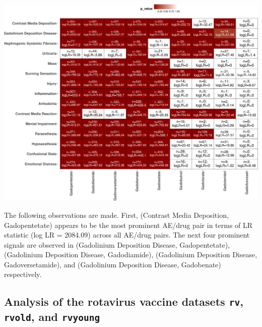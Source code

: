 \begin{center}\includegraphics[width=1\linewidth]{RJ-2023-027_files/figure-latex/heatmap-zip-gbca-latex-1} \end{center}

The following observations are made. First, (Contrast Media Deposition, Gadopentetate) appears to be the most prominent AE/drug pair in terms of LR statistic (log LR = 2084.09) across all AE/drug pairs. The next four prominent signals are observed in (Gadolinium Deposition Disease, Gadopentetate), (Gadolinium Deposition Disease, Gadodiamide), (Gadolinium Deposition Disease, Gadoversetamide), and (Gadolinium Deposition Disease, Gadobenate) respectively.

\hypertarget{analysis-of-the-rotavirus-vaccine-datasets-rv-rvold-and-rvyoung}{%
\subsection{\texorpdfstring{Analysis of the rotavirus vaccine datasets \texttt{rv}, \texttt{rvold}, and \texttt{rvyoung}}{Analysis of the rotavirus vaccine datasets rv, rvold, and rvyoung}}\label{analysis-of-the-rotavirus-vaccine-datasets-rv-rvold-and-rvyoung}}

